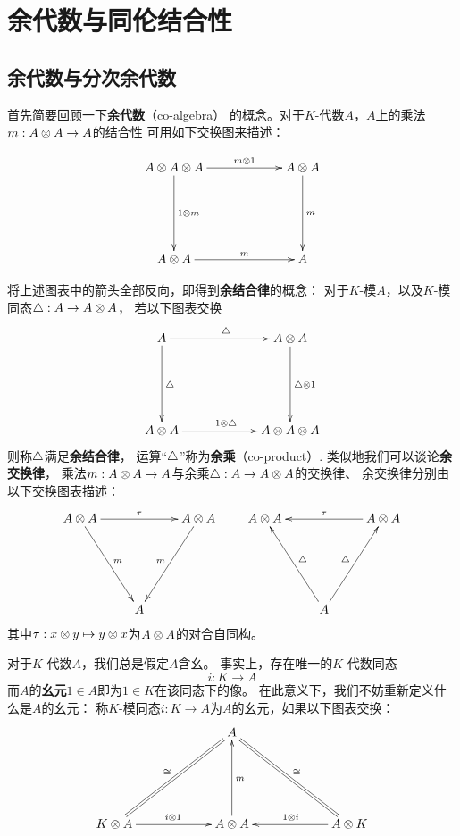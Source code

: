 

\chapter{余代数与同伦结合性}

\section{余代数与分次余代数}
首先简要回顾一下\textbf{余代数}（co-algebra）
的概念。对于$K$-代数$A$，$A$上的乘法$m:A\otimes A\to A$的结合性
可用如下交换图来描述：

$$
  \xymatrixcolsep{5pc}
  \xymatrixrowsep{5pc}
  \xymatrix{
     A\ten A\ten A  \ar[r]^-{m\ten 1}  \ar[d]^-{1\ten m}
    &A\ten A                           \ar[d]^-m
  \\
     A\ten A        \ar[r]^-m
    &A
  }
$$

将上述图表中的箭头全部反向，即得到\textbf{余结合律}的概念：
对于$K$-模$A$，以及$K$-模同态$\triangle:A\to A\otimes A$，
若以下图表交换
$$
  \xybigcol
  \xybigrow
  \xymatrix{
    A          \ar[r]^{\yc}   \ar[d]^{\yc}
   &A\ten A                   \ar[d]^{\yc\ten 1}
  \\
    A\ten A    \ar[r]^{1\ten\yc}
   &A\ten A\ten A
  }
$$
则称$\triangle$满足\textbf{余结合律}，
运算“$\triangle$”称为\textbf{余乘}（co-product）.
类似地我们可以谈论\textbf{余交换律}，
乘法$m:A\otimes A\to A$与余乘$\triangle:A\to A\otimes A$的交换律、
余交换律分别由以下交换图表描述：
$$
  \xybigrow
  \xymatrix{
    A\ten A \ar[rr]^{\tau}  \ar[dr]^m
    &&
    A\ten A \ar[dl]_{m}
  \\
    &A&
  }
\quad\quad
  \xybigrow
  \xymatrix{
    A\ten A
    &&
    A\ten A \ar[ll]_{\tau}
  \\
    &A \ar[ul]_{\yc}\ar[ur]^{\yc}
    &
  }
$$
其中$\tau: x\otimes y\mapsto y\otimes x$为$A\otimes A$的对合自同构。

对于$K$-代数$A$，我们总是假定$A$含幺。
事实上，存在唯一的$K$-代数同态
$$i:K\to A$$
而$A$的\textbf{幺元}$1\in A$即为$1\in K$在该同态下的像。
在此意义下，我们不妨重新定义什么是$A$的幺元：
称$K$-模同态$i:K\to A$为$A$的幺元，如果以下图表交换：
$$
  \xybigrow
  \xybigcol
  \xymatrix{
     &
       A\ar@{=}[ld]_{\cong}\ar@{=}[rd]^{\cong}
     &
  \\
       K\ten A  \ar[r]^{i\ten 1}
     & A\ten A  \ar[u]_{m}
     & A\ten K  \ar[l]_{1\ten i}
  }
$$

